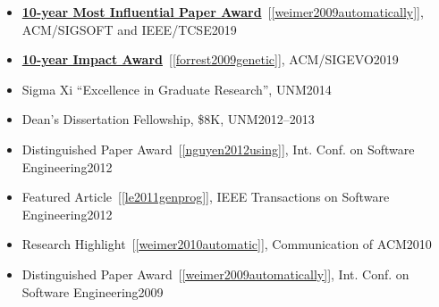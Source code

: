 \documentclass[11pt]{article}
\begin{document}
\begin{itemize}
    \item \href{https://www.sigsoft.org/awards/icseMIPAward.html}{\textbf{10-year Most Influential Paper Award}}~[\ref{weimer2009automatically}], ACM/SIGSOFT and IEEE/TCSE\hfill 2019
    
    
    \item \href{https://sig.sigevo.org/index.html/tiki-index.php?page=SIGEVO+Impact+Award}{\textbf{10-year Impact Award}}~[\ref{forrest2009genetic}], ACM/SIGEVO\hfill 2019
    
    \item  Sigma Xi ``Excellence in Graduate Research'', UNM\hfill 2014
    \item Dean's Dissertation Fellowship, \$8K, UNM\hfill 2012--2013
    
    \item Distinguished Paper Award~[\ref{nguyen2012using}], Int. Conf. on Software Engineering\hfill 2012
    
    \item Featured Article~[\ref{le2011genprog}], IEEE Transactions on Software Engineering\hfill 2012
    
    \item Research Highlight~[\ref{weimer2010automatic}], Communication of ACM\hfill 2010
    
    \item Distinguished Paper Award~[\ref{weimer2009automatically}], Int. Conf. on Software Engineering\hfill 2009
    

\end{itemize}
\end{document}
